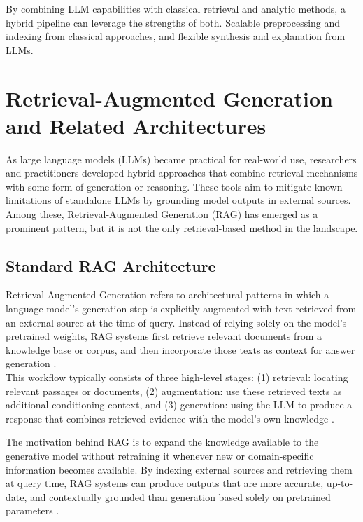 By combining LLM capabilities with classical retrieval and analytic methods, a hybrid pipeline can leverage the strengths of both. Scalable preprocessing and indexing from classical approaches, and flexible synthesis and explanation from LLMs.


\section{Retrieval-Augmented Generation and Related Architectures}

As large language models (LLMs) became practical for real-world use, researchers and practitioners developed hybrid approaches that combine retrieval mechanisms with some form of generation or reasoning. These tools aim to mitigate known limitations of standalone LLMs by grounding model outputs in external sources. Among these, Retrieval-Augmented Generation (RAG) has emerged as a prominent pattern, but it is not the only retrieval-based method in the landscape.

\subsection{Standard RAG Architecture}

Retrieval-Augmented Generation refers to architectural patterns in which a language model’s generation step is explicitly augmented with text retrieved from an external source at the time of query. Instead of relying solely on the model’s pretrained weights, RAG systems first retrieve relevant documents from a knowledge base or corpus, and then incorporate those texts as context for answer generation \cite{rag_wikipedia}\cite{what_is_rag_ibm}.  \\
This workflow typically consists of three high-level stages: (1) retrieval: locating relevant passages or documents, (2) augmentation: use these retrieved texts as additional conditioning context, and (3) generation: using the LLM to produce a response that combines retrieved evidence with the model’s own knowledge \cite{rag_wikipedia}.

The motivation behind RAG is to expand the knowledge available to the generative model without retraining it whenever new or domain-specific information becomes available. By indexing external sources and retrieving them at query time, RAG systems can produce outputs that are more accurate, up-to-date, and contextually grounded than generation based solely on pretrained parameters \cite{rag_openai}.

